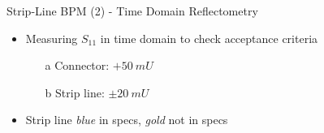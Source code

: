 \documentclass{beamer}
\begin{document}
\begin{frame}[t,fragile]{Strip-Line BPM (2) - Time Domain Reflectometry}
\begin{itemize}
\item Measuring $S_{11}$ in time domain to check acceptance criteria
\begin{itemize}
\item[a] Connector: $+\SI{50}{mU}$ 
\item[b] Strip line: $\pm\SI{20}{mU}$
\end{itemize}
\item Strip line \textit{blue} in specs, \textit{gold} not in specs
\end{itemize}

\begin{figure}
  \centering\setcounter{subfigure}{0}
  \quad
  \\
\end{figure}

\end{frame}
\end{document}
